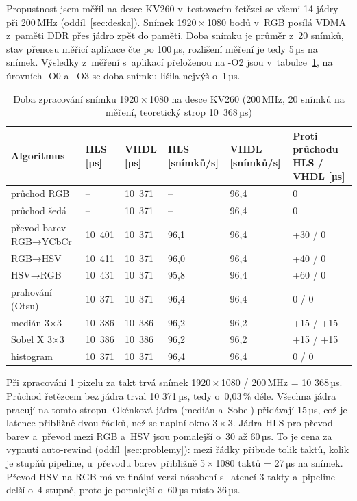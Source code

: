 Propustnost jsem měřil na desce KV260 v~testovacím řetězci se všemi 14 jádry při 200\,MHz (oddíl~\ref{sec:deska}). Snímek 1920\,×\,1080 bodů v~RGB posílá VDMA z~paměti DDR přes jádro zpět do paměti. Doba snímku je průměr z~20 snímků, stav přenosu měřicí aplikace čte po 100\,µs, rozlišení měření je tedy 5\,µs na snímek. Výsledky z~měření s~aplikací přeloženou na -O2 jsou v~tabulce~\ref{tab:propustnost}, na úrovních -O0 a~-O3 se doba snímku lišila nejvýš o~1\,µs.


\begin{table}[htbp]
    \centering
    \caption{Doba zpracování snímku 1920\,×\,1080 na desce KV260 (200\,MHz, 20 snímků na měření, teoretický strop 10 368\,µs)}
    \label{tab:propustnost}
    \begin{tabular}{p{3.6cm}p{1.8cm}p{1.8cm}p{1.5cm}p{1.5cm}p{3.0cm}}
        \toprule
        Algoritmus & HLS [µs] & VHDL [µs] & HLS [snímků/s] & VHDL [snímků/s] & Proti průchodu HLS / VHDL [µs] \\
        \midrule
        průchod RGB & – & 10 371 & – & 96,4 & 0 \\
        průchod šedá & – & 10 371 & – & 96,4 & 0 \\
        převod barev RGB→YCbCr & 10 401 & 10 371 & 96,1 & 96,4 & +30 / 0 \\
        RGB→HSV & 10 411 & 10 371 & 96,0 & 96,4 & +40 / 0 \\
        HSV→RGB & 10 431 & 10 371 & 95,8 & 96,4 & +60 / 0 \\
        prahování (Otsu) & 10 371 & 10 371 & 96,4 & 96,4 & 0 / 0 \\
        medián 3×3 & 10 386 & 10 386 & 96,2 & 96,2 & +15 / +15 \\
        Sobel X 3×3 & 10 386 & 10 386 & 96,2 & 96,2 & +15 / +15 \\
        histogram & 10 371 & 10 371 & 96,4 & 96,4 & 0 / 0 \\
        \bottomrule
    \end{tabular}
\end{table}


Při zpracování 1 pixelu za takt trvá snímek 1920\,×\,1080 / 200\,MHz = 10 368\,µs. Průchod řetězcem bez jádra trval 10 371\,µs, tedy o~0,03\,\% déle. Všechna jádra pracují na tomto stropu. Okénková jádra (medián a~Sobel) přidávají 15\,µs, což je latence přibližně dvou řádků, než se naplní okno 3\,×\,3. Jádra HLS pro převod barev a~převod mezi RGB a~HSV jsou pomalejší o~30 až 60\,µs. To je cena za vypnutí auto-rewind (oddíl~\ref{sec:problemy}): mezi řádky přibude tolik taktů, kolik je stupňů pipeline, u~převodu barev přibližně 5\,×\,1080 taktů = 27\,µs na snímek. Převod HSV na RGB má ve finální verzi násobení s~latencí 3 takty a~pipeline delší o~4 stupně, proto je pomalejší o~60\,µs místo 36\,µs.

